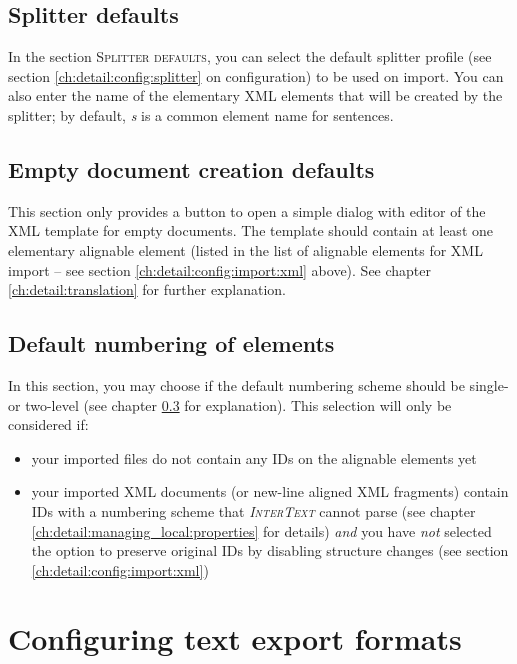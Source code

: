 \documentclass[a4paper,10pt,oneside]{book}
\newcommand{\IT}{\textit{\textsc{InterText}}\xspace}
\newcommand{\menu}[1]{\textsc{#1}}
\begin{document}
\subsection{Splitter defaults}\label{ch:detail:config:import:splitter}

In the section \menu{Splitter defaults}, you can select the default splitter profile (see section \ref{ch:detail:config:splitter} on configuration) to be used on import. You can also enter the name of the elementary XML elements that will be created by the splitter; by default, \emph{s} is a common element name for sentences.

\subsection{Empty document creation defaults}\label{ch:detail:config:import:empty}

This section only provides a button to open a simple dialog with editor of the XML template for empty documents. The template should contain at least one elementary alignable element (listed in the list of alignable elements for XML import -- see section \ref{ch:detail:config:import:xml} above). See chapter \ref{ch:detail:translation} for further explanation.

\subsection{Default numbering of elements}\label{ch:detail:config:import:numbering}

In this section, you may choose if the default numbering scheme should be single- or two-level (see chapter \ref{ch:detail:config:import:numbering} for explanation). This selection will only be considered if: 

\begin{itemize}
 \item your imported files do not contain any IDs on the alignable elements yet
 \item your imported XML documents (or new-line aligned XML fragments) contain IDs with a numbering scheme that \IT cannot parse (see chapter \ref{ch:detail:managing_local:properties} for details) \emph{and} you have \emph{not} selected the option to preserve original IDs by disabling structure changes (see section \ref{ch:detail:config:import:xml})
\end{itemize}

\section{Configuring text export formats}\label{ch:detail:config:export}
\end{document}
